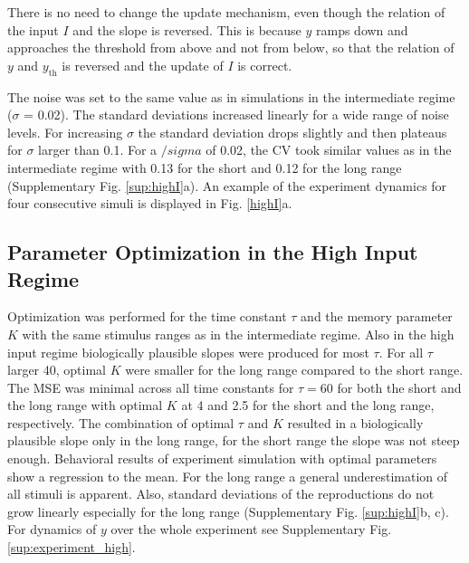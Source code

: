 \documentclass[10pt]{article}
\begin{document}
There is no need to change the update mechanism, even though the relation of the input $I$ and the slope is reversed. This is because $y$ ramps down and approaches the threshold from above and not from below, so that the relation of $y$ and $y_{\text{th}}$ is reversed and the update of $I$ is correct. 

The noise was set to the same value as in simulations in the intermediate regime ($\sigma$ = 0.02). The standard deviations increased linearly for a wide range of noise levels. For increasing $\sigma$ the standard deviation drops slightly and then plateaus for $\sigma$ larger than 0.1. For a $/sigma$ of 0.02, the CV took similar values as in the intermediate regime with 0.13 for the short and 0.12 for the long range (Supplementary Fig. \ref{sup:highI}a). 
An example of the experiment dynamics for four consecutive simuli is displayed in Fig. \ref{highI}a.

\subsection{Parameter Optimization in the High Input Regime}
Optimization was performed for the time constant $\tau$ and the memory parameter $K$ with the same stimulus ranges as in the intermediate regime. 
Also in the high input regime biologically plausible slopes were produced for most $\tau$. 
For all $\tau$ larger 40, optimal $K$ were smaller for the long range compared to the short range.
The MSE was minimal across all time constants for $\tau = 60$ for both the short and the long range with optimal $K$ at  4 and 2.5 for the short and the long range, respectively. The combination of optimal $\tau$ and $K$ resulted in a biologically plausible slope only in the long range, for the short range the slope was not steep enough. 
Behavioral results of experiment simulation with optimal parameters show a regression to the mean. For the long range a general underestimation of all stimuli is apparent. Also, standard deviations of the reproductions do not grow linearly especially for the long range (Supplementary Fig. \ref{sup:highI}b, c).
For dynamics of $y$ over the whole experiment see Supplementary Fig. \ref{sup:experiment_high}.
\end{document}
